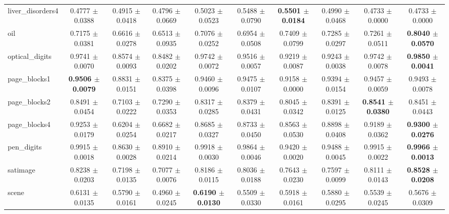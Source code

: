 \begin{table*}[htbp]
{\begin{tabular}{lccccccccc}
            liver\_disorders4 & 0.4777 $\pm$ 0.0388 & 0.4915 $\pm$ 0.0418 & 0.4796 $\pm$ 0.0669 & 0.5023 $\pm$ 0.0523 & 0.5488 $\pm$ 0.0790 & \cellcolor{graybg}\textbf{0.5501 $\pm$ 0.0184} & 0.4990 $\pm$ 0.0468 & 0.4733 $\pm$ 0.0000 & 0.4733 $\pm$ 0.0000 \\ 
            oil & 0.7175 $\pm$ 0.0381 & 0.6616 $\pm$ 0.0278 & 0.6513 $\pm$ 0.0935 & 0.7076 $\pm$ 0.0252 & 0.6954 $\pm$ 0.0508 & 0.7409 $\pm$ 0.0799 & 0.7285 $\pm$ 0.0297 & 0.7261 $\pm$ 0.0511 & \cellcolor{graybg}\textbf{0.8040 $\pm$ 0.0570} \\ 
            optical\_digits & 0.9741 $\pm$ 0.0070 & 0.8574 $\pm$ 0.0093 & 0.8482 $\pm$ 0.0202 & 0.9742 $\pm$ 0.0072 & 0.9516 $\pm$ 0.0057 & 0.9219 $\pm$ 0.0087 & 0.9243 $\pm$ 0.0038 & 0.9742 $\pm$ 0.0078 & \cellcolor{graybg}\textbf{0.9850 $\pm$ 0.0041} \\ 
            page\_blocks1 & \cellcolor{graybg}\textbf{0.9506 $\pm$ 0.0079} & 0.8831 $\pm$ 0.0151 & 0.8375 $\pm$ 0.0398 & 0.9460 $\pm$ 0.0096 & 0.9475 $\pm$ 0.0107 & 0.9158 $\pm$ 0.0000 & 0.9394 $\pm$ 0.0154 & 0.9457 $\pm$ 0.0059 & 0.9493 $\pm$ 0.0078 \\
            page\_blocks2 & 0.8491 $\pm$ 0.0454 & 0.7103 $\pm$ 0.0222 & 0.7290 $\pm$ 0.0353 & 0.8317 $\pm$ 0.0285 & 0.8379 $\pm$ 0.0431 & 0.8045 $\pm$ 0.0342 & 0.8391 $\pm$ 0.0125 & \cellcolor{graybg}\textbf{0.8541 $\pm$ 0.0380} & 0.8451 $\pm$ 0.0443 \\ 
            page\_blocks4 & 0.9253 $\pm$ 0.0179 & 0.6204 $\pm$ 0.0254 & 0.6682 $\pm$ 0.0217 & 0.8685 $\pm$ 0.0327 & 0.8733 $\pm$ 0.0450 & 0.8563 $\pm$ 0.0530 & 0.8898 $\pm$ 0.0408 & 0.9189 $\pm$ 0.0362 & \cellcolor{graybg}\textbf{0.9300 $\pm$ 0.0276} \\
            pen\_digits & 0.9915 $\pm$ 0.0018 & 0.8630 $\pm$ 0.0028 & 0.8910 $\pm$ 0.0214 & 0.9918 $\pm$ 0.0030 & 0.9864 $\pm$ 0.0046 & 0.9420 $\pm$ 0.0020 & 0.9488 $\pm$ 0.0045 & 0.9915 $\pm$ 0.0022 & \cellcolor{graybg}\textbf{0.9966 $\pm$ 0.0013} \\ 
            satimage & 0.8238 $\pm$ 0.0203 & 0.7198 $\pm$ 0.0135 & 0.7077 $\pm$ 0.0076 & 0.8186 $\pm$ 0.0115 & 0.8036 $\pm$ 0.0188 & 0.7643 $\pm$ 0.0230 & 0.7597 $\pm$ 0.0099 & 0.8111 $\pm$ 0.0143 & \cellcolor{graybg}\textbf{0.8528 $\pm$ 0.0208} \\ 
            scene & 0.6131 $\pm$ 0.0135 & 0.5790 $\pm$ 0.0161 & 0.4960 $\pm$ 0.0245 & \cellcolor{graybg}\textbf{0.6190 $\pm$ 0.0130} & 0.5509 $\pm$ 0.0330 & 0.5918 $\pm$ 0.0161 & 0.5880 $\pm$ 0.0295 & 0.5539 $\pm$ 0.0245 & 0.5676 $\pm$ 0.0309 \\ 

\end{tabular}}
\end{table*}
